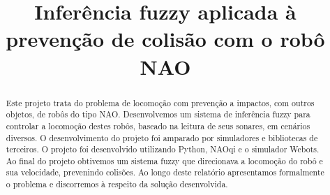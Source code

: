 \documentclass[twoside,conference,a4paper]{IEEEtran}
\begin{document}
\renewcommand{\IEEEkeywordsname}{Palavras-chave}


\title{Inferência fuzzy aplicada à prevenção de colisão com o robô NAO}
\author{%
}


\maketitle

\begin{abstract}
Este projeto trata do problema de locomoção com prevenção a impactos, com outros objetos, de robôs do tipo NAO. Desenvolvemos um sistema de inferência fuzzy para controlar a locomoção destes robôs, baseado na leitura de seus sonares, em cenários diversos. O desenvolvimento do projeto foi amparado por simuladores e bibliotecas de terceiros. O projeto foi desenvolvido utilizando Python, NAOqi e o simulador Webots. Ao final do projeto obtivemos um sistema fuzzy que direcionava a locomoção do robô e sua velocidade, prevenindo colisões. Ao longo deste relatório apresentamos formalmente o problema e discorremos à respeito da solução desenvolvida.

\end{abstract}
\end{document}
